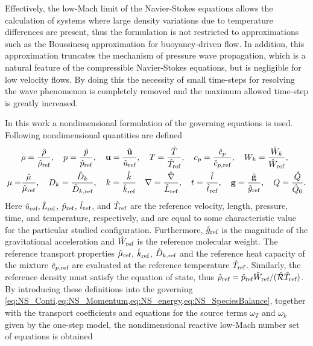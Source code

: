 Effectively, the low-Mach limit of the Navier-Stokes equations allows the calculation of systems where large density variations due to temperature differences are present, thus the formulation is not restricted to approximations such as the Boussinesq approximation for buoyancy-driven flow. In addition, this approximation truncates the mechanism of pressure wave propagation, which is a natural feature of the compressible Navier-Stokes equations, but is negligible for low velocity flows. By doing this the necessity of small time-steps for resolving the wave phenomenon is completely removed and the maximum allowed time-step is greatly increased.

In this work a nondimensional formulation of the governing equations is used. Following nondimensional quantities are defined
\begin{align*}
	      & \rho = \frac{\hat \rho}{\hat \rho_{\text{ref}}}, \quad
	p = \frac{\hat p}{\hat p_{\text{ref}}}, \quad
	\textbf{u}= \frac{\hat{\textbf{u}}}{\hat u_{\text{ref}}}, \quad
	T = \frac{\hat T}{\hat T_{\text{ref}}},  \quad
	c_p = \frac{\hat c_p}{\hat c_{p,\text{ref}}}, \quad
	W_k = \frac{\hat{W}_k}{\hat W_{\text{ref}}},
	\\
	\mu = & \frac{\hat \mu}{\hat \mu_{\text{ref}}},\quad
	D_k = \frac{\hat D_k}{\hat D_{k,\text{ref}}}, \quad
	k = \frac{\hat k}{\hat k_{\text{ref}}}\quad
	\nabla = \frac{\hat \nabla}{\hat L_{\text{ref}}}, \quad
	t = \frac{\hat{t}}{\hat t_{\text{ref}}},\quad
	\textbf{g} = \frac{\hat{\textbf{g}}}{\hat g_{\text{ref}}},\quad
	Q = \frac{\hat Q}{\hat{Q}_0}.
\end{align*}
Here $\hat u_{\text{ref}}, \hat L_{\text{ref}}$, $\hat p_{\text{ref}}$, $\hat t_{\text{ref}}$, and $\hat T_{\text{ref}}$ are the reference velocity, length, pressure, time, and temperature, respectively, and are equal to some characteristic value for the particular studied configuration. Furthermore, $\hat g_{\text{ref}}$ is the magnitude of the gravitational acceleration and $\hat W_{\text{ref}}$ is the reference molecular weight. The reference transport properties $\hat \mu_{\text{ref}}$, $\hat k_{\text{ref}}$, $\hat D_{k,\text{ref}}$ and the reference heat capacity of the mixture $\hat c_{p,\text{ref}}$ are evaluated at the reference temperature $\hat T_{\text{ref}}$. Similarly, the reference density must satisfy the equation of state, thus $\hat \rho_{\text{ref}} = \hat p_{\text{ref}}\hat W_{\text{ref}}/(\hat{\mathcal{R}}\hat T_{\text{ref}})$.  By introducing these definitions into the governing  \cref{eq:NS_Conti,eq:NS_Momentum,eq:NS_energy,eq:NS_SpeciesBalance}, together with the transport coefficients and equations for the source terms $\omega_T$ and $\omega_k$ given by the one-step model, the nondimensional reactive low-Mach number set of equations is obtained
